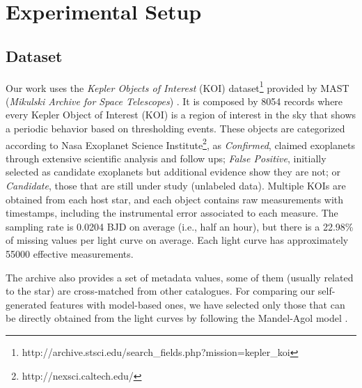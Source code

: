 \section{Experimental Setup}
\label{exp}

\subsection{Dataset}

Our work uses the \textit{Kepler Objects of Interest} (KOI) dataset\footnote{http://archive.stsci.edu/search\_fields.php?mission=kepler\_koi} provided by MAST (\textit{Mikulski Archive for Space Telescopes}) \citep{akeson2013nasa}. It is composed by 8054 records where every Kepler Object of Interest (KOI) is a region of interest in the sky that shows a periodic behavior based on thresholding events. These objects are categorized according to Nasa Exoplanet Science Institute\footnote{http://nexsci.caltech.edu/}, as \textit{Confirmed}, claimed exoplanets through extensive scientific analysis and follow ups; \textit{False Positive}, initially selected as candidate exoplanets but additional evidence show they are not; or \textit{Candidate}, those that are still under study (unlabeled data).
Multiple KOIs are obtained from each host star, and each object contains raw measurements with timestamps, including the instrumental error associated to each measure. The sampling rate is 0.0204 BJD on average (i.e., half an hour), but there is a 22.98\% of missing values per light curve on average. Each light curve has approximately 55000 effective measurements.

The archive also provides a set of metadata values, some of them (usually related to the star) are cross-matched from other catalogues. For comparing our self-generated features with model-based ones, we have selected only those that can be directly obtained from the light curves by following the Mandel-Agol model \citep{mandel2002analytic}.

